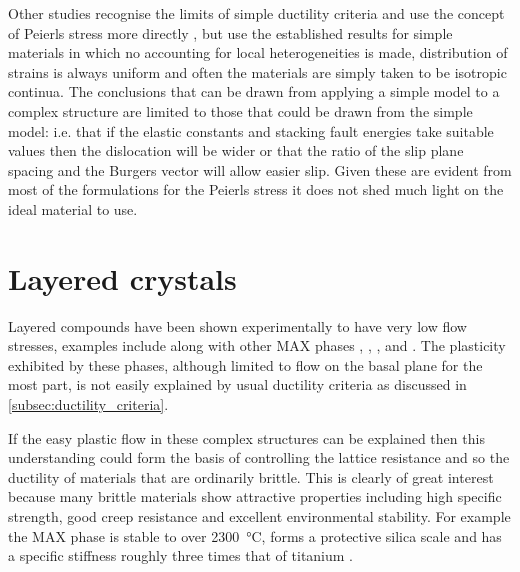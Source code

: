 Other studies recognise the limits of simple ductility criteria and use the concept of Peierls stress more directly \cite{Music2008,Emmerlich2009,Gouriet2015}, but use the established results for simple materials in which no accounting for local heterogeneities is made, distribution of strains is always uniform and often the materials are simply taken to be isotropic continua. The conclusions that can be drawn from applying a simple model to a complex structure are limited to those that could be drawn from the simple model: i.e. that if the elastic constants and stacking fault energies take suitable values then the dislocation will be wider or that the ratio of the slip plane spacing and the Burgers vector will allow easier slip. Given these are evident from most of the formulations for the Peierls stress it does not shed much light on the ideal material to use.





















\FloatBarrier
\section{Layered crystals}
\FloatBarrier
\label{sec:layered_crystals}



Layered compounds have been shown experimentally to have very low flow stresses, examples include  along with other MAX phases \cite{Barsoum2011},  \cite{Korte2012NbCo},  \cite{Telle2006},  and  \cite{Sygnatowicz2015}. The plasticity exhibited by these phases, although limited to flow on the basal plane for the most part, is not easily explained by usual ductility criteria as discussed in \autoref{subsec:ductility_criteria}. 

If the easy plastic flow in these complex structures can be explained then this understanding could form the basis of controlling the lattice resistance and so the ductility of materials that are ordinarily brittle. This is clearly of great interest because many brittle materials show attractive properties including high specific strength, good creep resistance and excellent environmental stability. For example the MAX phase  is stable to over \SI{2300}{\celsius}, forms a protective silica scale and has a specific stiffness roughly three times that of titanium \cite{Radovic2013}.

